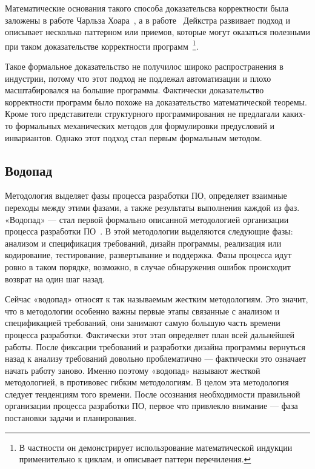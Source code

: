 Математические основания такого способа доказательсва корректности была заложены в работе Чарльза Хоара~\cite{Hoare:1969:ABC}, а в работе~\cite{Dijkstra:1972:CIN} Дейкстра развивает подход и описывает несколько паттерном или приемов, которые могут оказаться полезными при таком доказательстве корректности программ~\footnote{В частности он демонстрирует использрование математической индукции применительно к циклам, и описывает паттерн перечиления.}.

Такое формальное доказательство не получилос широко распространения в индустрии, потому что этот подход не подлежал автоматизации и плохо масштабировался на большие программы. Фактически доказательство корректности программ было похоже на доказательство математической теоремы. Кроме того представители структурного программирования не предлагали каких-то формальных механических методов для формулировки предусловий и инвариантов. Однако этот подход стал первым формальным методом.

\subsection{Водопад}

Методология выделяет фазы процесса разработки ПО, определяет взаимные переходы между этими фазами, а также результаты выполнения каждой из фаз. «Водопад» — стал первой формально описанной методологией организации процесса разработки ПО~\cite{Royce:1987:MDL}. В этой методологии выделяются следующие фазы: анализом и спецификация требований, дизайн программы, реализация или кодирование, тестирование, развертывание и поддержка. Фазы процесса идут ровно в таком порядке, возможно, в случае обнаружения ошибок происходит возврат на один шаг назад.

Сейчас «водопад» относят к так называемым жестким методологиям. Это значит, что в методологии особенно важны первые этапы связанные с анализом и спецификацией требований, они занимают самую большую часть времени процесса разработки. Фактически этот этап определяет план всей дальнейшей работы. После фиксации требований и разработки дизайна программы вернуться назад к анализу требований довольно проблематично — фактически это означает начать работу заново. Именно поэтому «водопад» называют жесткой методологией, в противовес гибким методологиям. В целом эта методология следует тенденциям того времени. После осознания необходимости правильной организации процесса разработки ПО, первое что привлекло внимание — фаза постановки задачи и планирования.

